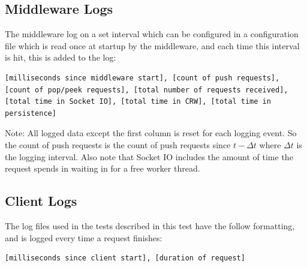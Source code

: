 \documentclass{article}
\begin{document}
            \subsection{Middleware Logs}
            The middleware log on a set interval which can be configured in a configuration file which is read once at startup by the middleware, and each time this interval is hit, this is added to the log:
            \begin{lstlisting}[breaklines]
            [milliseconds since middleware start], [count of push requests], [count of pop/peek requests], [total number of requests received], [total time in Socket IO], [total time in CRW], [total time in persistence]
            \end{lstlisting}
            Note: All logged data except the first column is reset for each logging event. So the count of push requests is the count of push requests since $t-\Delta t$ where $\Delta t$ is the logging interval. Also note that Socket IO includes the amount of time the request spends in waiting in for a free worker thread.


            \subsection{Client Logs}
            The log files used in the tests described in this test have the follow formatting, and is logged every time a request finishes:
            \begin{lstlisting}[breaklines]
            [milliseconds since client start], [duration of request]
            \end{lstlisting}
\end{document}

